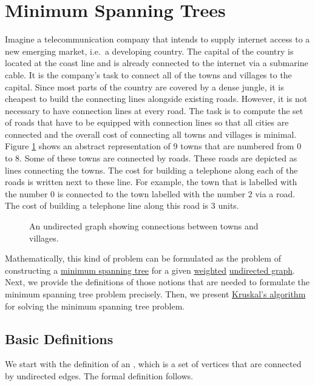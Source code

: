 \section{Minimum Spanning Trees}
Imagine a telecommunication company that intends to supply internet access to a new emerging market, i.e.~a
developing country.  The capital of the country is located at the coast line and is already connected to the internet via
a submarine cable. It is the company's task to connect all of the towns and villages to the capital.
Since most parts of the country are covered by a dense jungle, it is cheapest to build the connecting lines
alongside existing roads.  However, it is not necessary to have connection lines at every road.  The task is to
compute the set of roads that have to be equipped with connection lines so that all cities are connected and
the overall cost of connecting all towns and villages is minimal.  Figure \ref{fig:tiny-graph.pdf} shows an
abstract representation of 9 towns that are numbered from $0$ to $8$.  Some of these towns are connected by
roads.  These roads are depicted as lines connecting the towns.  The cost for building a telephone along each of
the roads is written next to these line.  For example, the town that is labelled with the number $0$ is connected to the
town labelled with the number $2$ via a road.  The cost of building a telephone line along this road is $3$ units.


\begin{figure}[!ht]
  \centering
  \hspace*{-0.8cm}
  \caption{An undirected graph showing connections between towns and villages.}
  \label{fig:tiny-graph.pdf}
\end{figure}


Mathematically, this kind of problem can be formulated as the problem of
constructing a \href{https://en.wikipedia.org/wiki/Minimum_spanning_tree}{minimum spanning tree} for
a given \href{https://en.wikipedia.org/wiki/Graph_(discrete_mathematics)#Weighted_graph}{weighted}
\href{https://en.wikipedia.org/wiki/Graph_(discrete_mathematics)#Undirected_graph}{undirected graph}.
Next, we provide the definitions of those notions that are needed to formulate the minimum spanning
tree problem precisely.  Then, we present
\href{https://en.wikipedia.org/wiki/Kruskal%27s_algorithm}{Kruskal's algorithm} for solving the
minimum spanning tree problem. 

\subsection{Basic Definitions}
We start with the definition of an , which is a set of vertices that are connected by
undirected edges.  The formal definition follows.

